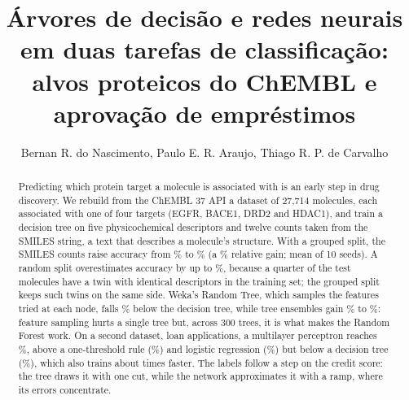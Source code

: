 \documentclass[12pt]{article}
\title{Árvores de decisão e redes neurais em duas tarefas de classificação: alvos proteicos do ChEMBL e aprovação de empréstimos}
\author{Bernan R. do Nascimento\inst{1}, Paulo E. R. Araujo\inst{1}, Thiago R. P. de Carvalho\inst{1}}
\begin{document}
\maketitle

\begin{abstract}
  Predicting which protein target a molecule is associated with is an early step in drug discovery.
  We rebuild from the ChEMBL 37 API a dataset of 27,714 molecules, each associated with one of four
  targets (EGFR, BACE1, DRD2 and HDAC1), and train a decision tree on five physicochemical
  descriptors and twelve counts taken from the SMILES string, a text that describes a molecule's
  structure. With a grouped split, the SMILES counts raise accuracy from \accGrupDescEn\% to
  \accGrupAmbosEn\% (a \ganhoAmbosEn\% relative gain; mean of 10 seeds). A random split overestimates
  accuracy by up to \gapMaxEn\%, because a quarter of the test molecules have a twin with identical
  descriptors in the training set; the grouped split keeps such twins on the same side. Weka's Random
  Tree, which samples the features tried at each node, falls \relRTEn\% below the decision tree, while
  tree ensembles gain \relHGBEn\% to \relGBajEn\%: feature sampling hurts a single tree but, across
  300 trees, it is what makes the Random Forest work. On a second dataset, \rnLinhasEn{} loan applications, a
  multilayer perceptron reaches \rnAccRedeEn\%, above a one-threshold rule (\rnAccRegraEn\%) and logistic
  regression (\rnAccLogEn\%) but below a decision tree (\rnAccArvEn\%), which also trains about
  \rnRazaoTreino{} times faster. The labels follow a step on the credit score: the tree draws it with one cut,
  while the network approximates it with a ramp, where its errors concentrate.
\end{abstract}
\end{document}
